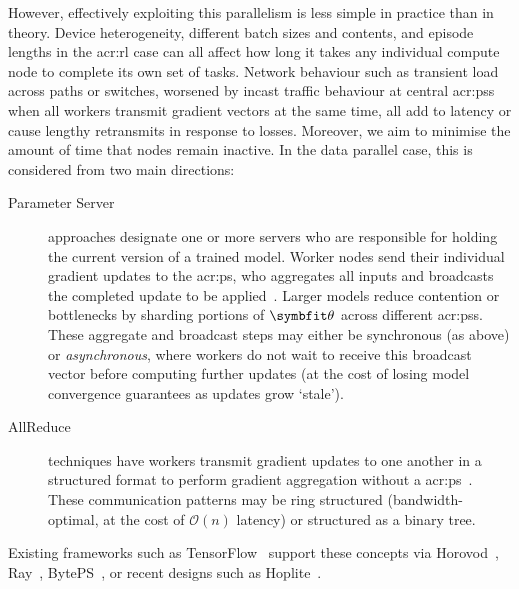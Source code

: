 
However, effectively exploiting this parallelism is less simple in practice than in theory.
Device heterogeneity, different batch sizes and contents, and episode lengths in the \gls{acr:rl} case can all affect how long it takes any individual compute node to complete its own set of tasks.
Network behaviour such as transient load across paths or switches, worsened by incast traffic behaviour at central \glspl{acr:ps} when all workers transmit gradient vectors at the same time, all add to latency or cause lengthy retransmits in response to losses.
Moreover, we aim to minimise the amount of time that nodes remain inactive.
In the data parallel case, this is considered from two main directions:
\begin{description}
	\item[Parameter Server] approaches designate one or more servers who are responsible for holding the current version of a trained model.
	Worker nodes send their individual gradient updates to the \gls{acr:ps}, who aggregates all inputs and broadcasts the completed update to be applied~\parencite{DBLP:conf/nips/DeanCMCDLMRSTYN12,DBLP:conf/osdi/LiAPSAJLSS14}.
	Larger models reduce contention or bottlenecks by sharding portions of $\wvec{}$ across different \glspl{acr:ps}.
	These aggregate and broadcast steps may either be synchronous (as above) or \emph{asynchronous}, where workers do not wait to receive this broadcast vector before computing further updates (at the cost of losing model convergence guarantees as updates grow `stale').
	
	\item[AllReduce] techniques have workers transmit gradient updates to one another in a structured format to perform gradient aggregation without a \gls{acr:ps}~\parencite{DBLP:conf/cluster/MamidalaLP04,DBLP:conf/ipps/PatarasukY07}.
	These communication patterns may be ring structured (bandwidth-optimal, at the cost of $\mathcal{O}\left(n\right)$ latency) or structured as a binary tree.
\end{description}
Existing frameworks such as TensorFlow~\parencite{DBLP:journals/corr/AbadiABBCCCDDDG16} support these concepts via Horovod~\parencite{DBLP:journals/corr/abs-1802-05799}, Ray~\parencite{DBLP:conf/osdi/MoritzNWTLLEYPJ18}, BytePS~\parencite{DBLP:conf/osdi/JiangZLYCG20}, or recent designs such as Hoplite~\parencite{DBLP:conf/sigcomm/ZhuangLZWLNMS21}.

